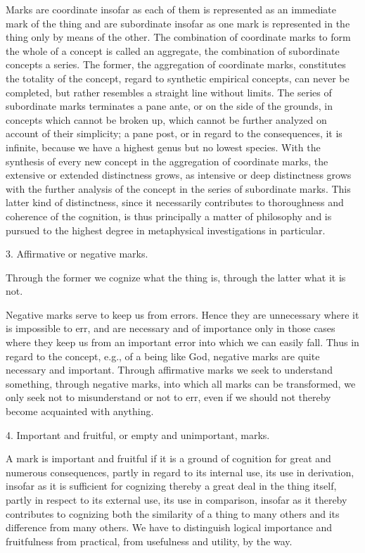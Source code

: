 Marks are coordinate insofar as each of them is
represented as an immediate mark of the thing
and are subordinate insofar as one mark is
represented in the thing only by means of the other.
The combination of coordinate marks to form
the whole of a concept is called an aggregate,
the combination of subordinate concepts a series.
The former, the aggregation of coordinate marks,
constitutes the totality of the concept,
regard to synthetic empirical concepts, can never be completed,
but rather resembles a straight line without limits.
The series of subordinate marks terminates a pane ante,
or on the side of the grounds, in concepts which cannot be broken up,
which cannot be further analyzed on account of their simplicity;
a pane post, or in regard to the consequences, it is infinite,
because we have a highest genus but no lowest species.
With the synthesis of every new concept in the aggregation of coordinate marks,
the extensive or extended distinctness grows,
as intensive or deep distinctness grows with the further
analysis of the concept in the series of subordinate marks.
This latter kind of distinctness, since it necessarily
contributes to thoroughness and coherence of the cognition,
is thus principally a matter of philosophy and is pursued
to the highest degree in metaphysical investigations in particular.

3. Affirmative or negative marks.

Through the former we cognize what the thing is,
through the latter what it is not.

Negative marks serve to keep us from errors.
Hence they are unnecessary where it is impossible to err,
and are necessary and of importance only in
those cases where they keep us from an important error
into which we can easily fall.
Thus in regard to the concept, e.g., of a being like God,
negative marks are quite necessary and important.
Through affirmative marks we seek to understand something,
through negative marks, into which all marks can be transformed,
we only seek not to misunderstand or not to err,
even if we should not thereby become acquainted with anything.

4. Important and fruitful, or empty and unimportant, marks.

A mark is important and fruitful
if it is a ground of cognition for great
and numerous consequences,
partly in regard to its internal use,
its use in derivation, insofar as
it is sufficient for cognizing thereby
a great deal in the thing itself,
partly in respect to its external use,
its use in comparison,
insofar as it thereby contributes to cognizing
both the similarity of a thing to many others
and its difference from many others.
We have to distinguish logical importance and fruitfulness
from practical, from usefulness and utility, by the way.

